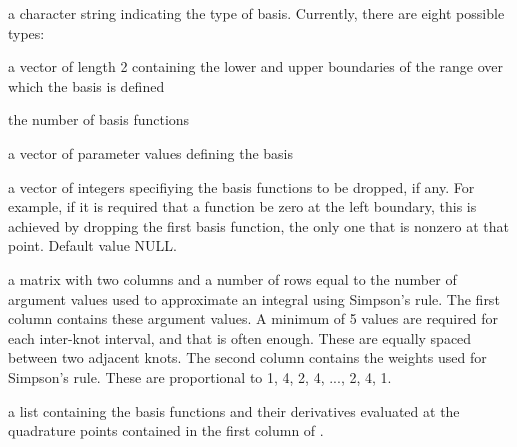 \begin{Arguments}
\begin{ldescription}
\item[\code{type}] a character string indicating the type of basis.  Currently,
there are eight possible types:



\item[\code{rangeval}] a vector of length 2 containing the lower and upper boundaries
of the range over which the basis is defined

\item[\code{nbasis}] the number of basis functions

\item[\code{params}] a vector of parameter values defining the basis

\item[\code{dropind}] a vector of integers specifiying the basis functions to
be dropped, if any.  For example, if it is required that
a function be zero at the left boundary, this is achieved
by dropping the first basis function, the only one that
is nonzero at that point. Default value NULL.

\item[\code{quadvals}] a matrix with two columns and a number of rows equal to the number of
argument values used to approximate an integral using Simpson's rule.
The first column contains these argument values.
A minimum of 5 values are required for
each inter-knot interval, and that is often enough. These
are equally spaced between two adjacent knots.
The second column contains the weights used for Simpson's
rule.  These are proportional to 1, 4, 2, 4, ..., 2, 4, 1.

\item[\code{values}] a list containing the basis functions and their derivatives
evaluated at the quadrature points contained in the first
column of .

\end{ldescription}
\end{Arguments}
